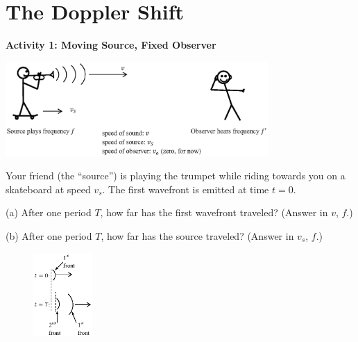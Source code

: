 \section{The Doppler Shift}

\makelabheader %

\vspace{0.1in}
%


\textbf{Activity 1: Moving Source, Fixed Observer}

\begin{center}
\includegraphics[width=0.75\textwidth]{doppler_shift/moving_source.eps}
\end{center}

Your friend (the ``source'') is playing the trumpet while riding towards you on a skateboard at speed $v_s$.  The first wavefront is emitted at time $t=0$.

(a) After one period $T$, how far has the first wavefront traveled?  (Answer in $v$, $f$.)
\vspace{1.0in}

(b) After one period $T$, how far has the source traveled? (Answer in $v_s$, $f$.)
\vspace{1.0in}

\begin{figure}
    \vspace{-0.9 in}
\includegraphics[width=0.2\textwidth]{doppler_shift/front_motion.eps}
\end{figure}

